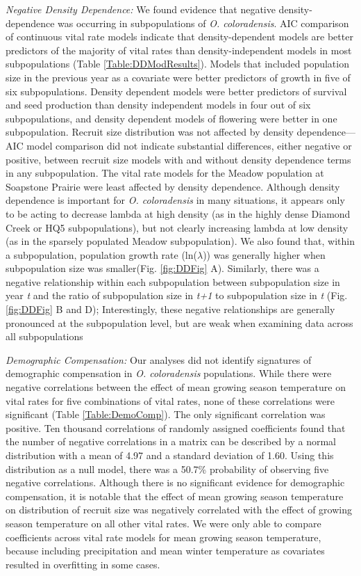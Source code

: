 \documentclass[12pt, letterpaper]{article}
\begin{document}
\textit{Negative Density Dependence:} We found evidence that negative density-dependence was occurring in subpopulations of \textit{O. coloradensis}. AIC comparison of continuous vital rate models indicate that density-dependent models are better predictors of the majority of vital rates than density-independent models in most subpopulations (Table \ref{Table:DDModResults}).  Models that included population size in the previous year as a covariate were better predictors of growth in five of six subpopulations. Density dependent models were better predictors of survival and seed production than density independent models in four out of six subpopulations, and density dependent models of flowering were better in one subpopulation. Recruit size distribution was not affected by density dependence—AIC model comparison did not indicate substantial differences, either negative or positive, between recruit size models with and without density dependence terms in any subpopulation. The vital rate models for the Meadow population at Soapstone Prairie were least affected by density dependence. Although density dependence is important for \textit{O. coloradensis} in many situations, it appears only to be acting to decrease lambda at high density (as in the highly dense Diamond Creek or HQ5 subpopulations), but not clearly increasing lambda at low density (as in the sparsely populated Meadow subpopulation). We also found that, within a subpopulation, population growth rate (ln($\lambda$)) was generally higher when subpopulation size was smaller(Fig. \ref{fig:DDFig} A). Similarly, there was a negative relationship within each subpopulation between subpopulation size in year \textit{t} and the ratio of subpopulation size in \textit{t+1} to subpopulation size in \textit{t} (Fig. \ref{fig:DDFig} B and D); Interestingly, these negative relationships are generally pronounced at the subpopulation level, but are weak when examining data across all subpopulations

\textit{Demographic Compensation:} Our analyses did not identify signatures of demographic compensation in \textit{O. coloradensis} populations. While there were negative correlations between the effect of mean growing season temperature on vital rates for five combinations of vital rates, none of these correlations were significant (Table \ref{Table:DemoComp}). The only significant correlation was positive. Ten thousand correlations of randomly assigned coefficients found that the number of negative correlations in a matrix can be described by a normal distribution with a mean of 4.97 and a standard deviation of 1.60. Using this distribution as a null model, there was a 50.7\% probability of observing five negative correlations. Although there is no significant evidence for demographic compensation, it is notable that the effect of mean growing season temperature on distribution of recruit size was negatively correlated with the effect of growing season temperature on all other vital rates. We were only able to compare coefficients across vital rate models for mean growing season temperature, because including precipitation and mean winter temperature as covariates resulted in overfitting in some cases.  
\end{document}
